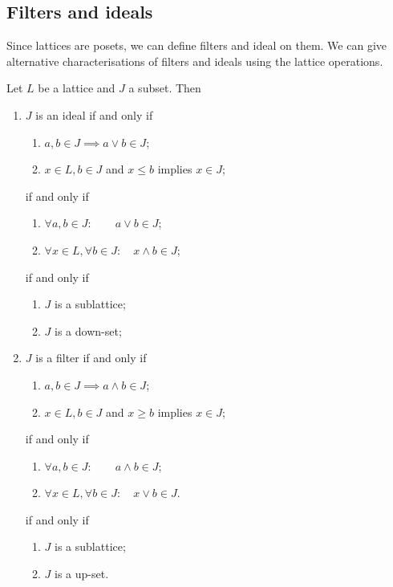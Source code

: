 \subsection{Filters and ideals}
Since lattices are posets, we can define filters and ideal on them.
We can give alternative characterisations of filters and ideals using the lattice operations.
\begin{lemma}
Let $L$ be a lattice and $J$ a subset. Then
\begin{enumerate}
\item $J$ is an ideal \textup{if and only if}
\begin{enumerate}
\item $a,b\in J \implies a\vee b\in J$;
\item $x\in L, b\in J$ and $x\leq b$ implies $x\in J$;
\end{enumerate}
\textup{if and only if}
\begin{enumerate}
\item $\forall a,b\in J: \qquad a\vee b\in J$;
\item $\forall x\in L, \forall b\in J: \quad x\wedge b \in J$;
\end{enumerate}
\textup{if and only if}
\begin{enumerate}
\item $J$ is a sublattice;
\item $J$ is a down-set;
\end{enumerate}
\item $J$ is a filter \textup{if and only if}
\begin{enumerate}
\item $a,b\in J \implies a\wedge b\in J$;
\item $x\in L, b\in J$ and $x\geq b$ implies $x\in J$;
\end{enumerate}
\textup{if and only if}
\begin{enumerate}
\item $\forall a,b\in J: \qquad a\wedge b\in J$;
\item $\forall x\in L, \forall b\in J: \quad x\vee b \in J$.
\end{enumerate}
\textup{if and only if}
\begin{enumerate}
\item $J$ is a sublattice;
\item $J$ is a up-set.
\end{enumerate}
\end{enumerate}
\end{lemma}

